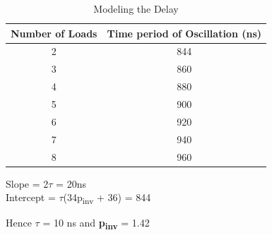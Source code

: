 \documentclass[12pt]{article}
\begin{document}
 \begin{table}[!h]
\centering  %
\begin{tabular}{|c | c |}                                                             
\hline  %
Number of Loads & Time period of Oscillation (ns) \\  %
\hline  %
2	& 844\\
3	& 860\\
4	& 880\\
5	& 900\\
6	& 920\\
7	& 940\\
8	& 960\\


\hline  %
\end{tabular}
\caption{Modeling the Delay}
\label{table:demotable}
\end{table}
Slope = 2$\tau$ = 20ns\\
Intercept = $\tau$\times(34p\textsubscript{inv} + 36) = 844

\vspace{20mm}
Hence \textbf{$\tau$} = 10 ns and \textbf{p\textsubscript{inv}} = 1.42
\end{document}
